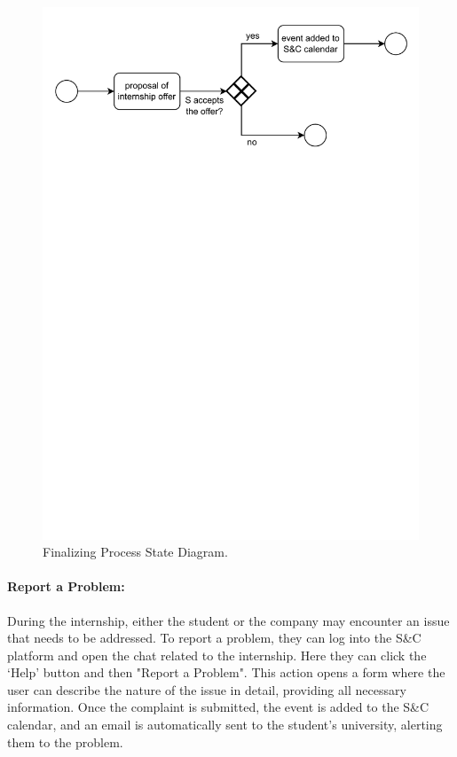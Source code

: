 \begin{figure}[H]
    \begin{center}
        \includegraphics[width=\linewidth]{Images/StateDiagram/FinalizingProcess.pdf}
        \caption{Finalizing Process State Diagram.}
        \label{fig:finalizing_process_state_diag}%
    \end{center}
\end{figure}

\newpage

\paragraph{Report a Problem:} During the internship, either the student
  or the company may encounter an issue that needs to be addressed. To
  report a problem, they can log into the S\&C platform and open the
  chat related to the internship. Here they can click the `Help' button
  and then "Report a Problem". This action opens a form where the user can describe the nature of the
  issue in detail, providing all necessary information. Once the complaint
  is submitted, the event is added to the S\&C calendar, and an email is
  automatically sent to the student's university, alerting them to the problem.

